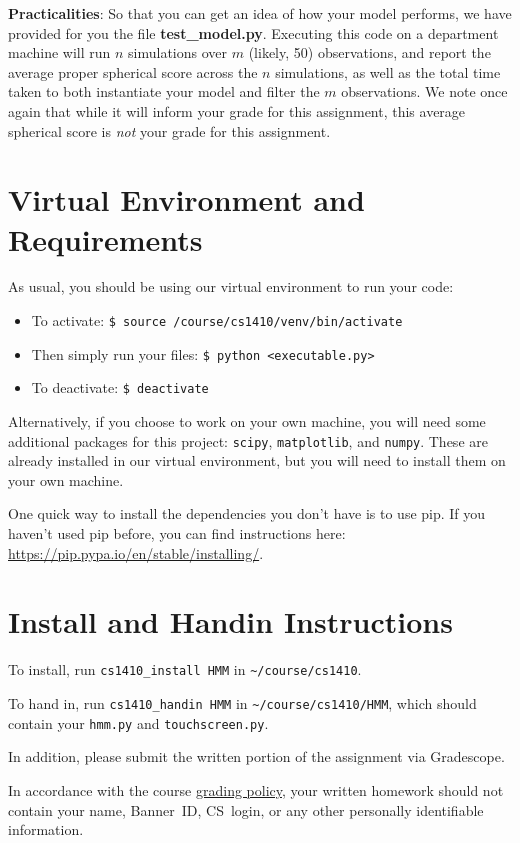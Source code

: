 \documentclass{article}
\begin{document}
\textbf{Practicalities}: So that you can get an idea of how your model
performs, we have provided for you the file \textbf{test\_model.py}.
Executing this code on a department machine will run $n$ simulations
over $m$ (likely, 50) observations, and report the average proper
spherical score across the $n$ simulations, as well as the total time
taken to both instantiate your model and filter the $m$ observations.
We note once again that while it will inform your grade for this
assignment, this average spherical score is \emph{not\/} your grade
for this assignment.


\section{Virtual Environment and Requirements}
As usual, you should be using our virtual environment to run your code:
\begin{itemize}
\setlength\itemsep{0em}

\item[] To activate: \texttt{\$ source /course/cs1410/venv/bin/activate}

\item[] Then simply run your files: \texttt{\$ python <executable.py>}

\item[] To deactivate: \texttt{\$ deactivate}
\end{itemize}
    
Alternatively, if you choose to work on your own machine, you will
need some additional packages for this project: \texttt{scipy},
\texttt{matplotlib}, and \texttt{numpy}. These are already installed
in our virtual environment, but you will need to install them on your
own machine.
    
One quick way to install the dependencies you don't have is to use
pip. If you haven't used pip before, you can find instructions here:
\url{https://pip.pypa.io/en/stable/installing/}.


\section{Install and Handin Instructions}
To install, run \verb|cs1410_install HMM| in \verb|~/course/cs1410|.

To hand in, run \verb|cs1410_handin HMM| in \verb|~/course/cs1410/HMM|,
which should contain your \verb|hmm.py| and \verb|touchscreen.py|.

In addition, please submit the written portion of the assignment via Gradescope.

In accordance with the course \href{https://forms.gle/DqfbBY8jdaqenRoa9}{grading policy}, your
written homework should not contain your name, Banner~ID, CS~login, or any other personally
identifiable information.
\end{document}
